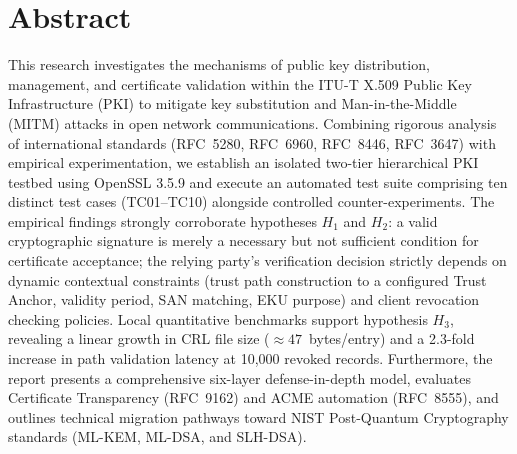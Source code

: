 \documentclass[12pt,a4paper]{report}
\begin{document}
\chapter*{Abstract}
This research investigates the mechanisms of public key distribution, management, and certificate validation within the ITU-T X.509 Public Key Infrastructure (PKI) to mitigate key substitution and Man-in-the-Middle (MITM) attacks in open network communications. Combining rigorous analysis of international standards (RFC~5280, RFC~6960, RFC~8446, RFC~3647) with empirical experimentation, we establish an isolated two-tier hierarchical PKI testbed using OpenSSL 3.5.9 and execute an automated test suite comprising ten distinct test cases (TC01--TC10) alongside controlled counter-experiments. The empirical findings strongly corroborate hypotheses $H_1$ and $H_2$: a valid cryptographic signature is merely a necessary but not sufficient condition for certificate acceptance; the relying party's verification decision strictly depends on dynamic contextual constraints (trust path construction to a configured Trust Anchor, validity period, SAN matching, EKU purpose) and client revocation checking policies. Local quantitative benchmarks support hypothesis $H_3$, revealing a linear growth in CRL file size ($\approx 47$~bytes/entry) and a 2.3-fold increase in path validation latency at 10,000 revoked records. Furthermore, the report presents a comprehensive six-layer defense-in-depth model, evaluates Certificate Transparency (RFC~9162) and ACME automation (RFC~8555), and outlines technical migration pathways toward NIST Post-Quantum Cryptography standards (ML-KEM, ML-DSA, and SLH-DSA).

\tableofcontents
\listoftables
\listoffigures
\clearpage
{}












\end{document}

